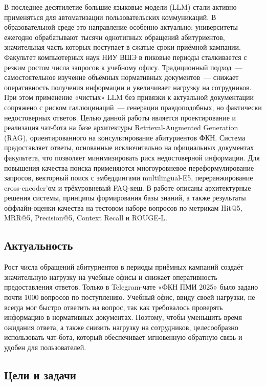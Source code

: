 \documentclass{article}
\begin{document}
В последнее десятилетие большие языковые модели (LLM) стали активно применяться
для автоматизации пользовательских коммуникаций. В образовательной среде это
направление особенно актуально: университеты ежегодно обрабатывают тысячи
однотипных обращений абитуриентов, значительная часть которых поступает в сжатые
сроки приёмной кампании.
Факультет компьютерных наук НИУ ВШЭ в пиковые периоды сталкивается с резким
ростом числа запросов к учебному офису. Традиционный подход~--- самостоятельное
изучение объёмных нормативных документов~--- снижает оперативность получения
информации и увеличивает нагрузку на сотрудников. При этом применение «чистых»
LLM без привязки к актуальной документации сопряжено с риском галлюцинаций~---
генерации правдоподобных, но фактически недостоверных ответов.
Целью данной работы является проектирование и реализация чат-бота на базе
архитектуры Retrieval-Augmented Generation (RAG), ориентированного на консультирование
абитуриентов ФКН. Система предоставляет ответы, основанные исключительно на
официальных документах факультета, что позволяет минимизировать риск недостоверной
информации. Для повышения качества поиска применяются многоуровневое
переформулирование запросов, векторный поиск с эмбеддингами multilingual-E5,
переранжирование cross-encoder'ом и трёхуровневый FAQ-кеш.
В работе описаны архитектурные решения системы, принципы формирования базы
знаний, а также результаты оффлайн-оценки качества на тестовом
наборе вопросов по метрикам Hit@5, MRR@5, Precision@5, Context Recall и ROUGE-L.


\noindent 
\subsection{Актуальность}
\noindent
Рост числа обращений абитуриентов в периоды приёмных кампаний создаёт значительную нагрузку на учебные офисы и снижает оперативность предоставления ответов. Только в Telegram-чате «ФКН ПМИ 2025» было задано почти 1000 вопросов по поступлению. Учебный офис, ввиду своей нагрузки, не всегда мог быстро ответить на вопрос, так как требовалось проверять информацию в нормативных документах. Поэтому, чтобы уменьшить время ожидания ответа, а также снизить нагрузку на сотрудников, целесообразно использовать чат-бота, который обеспечивает мгновенную обратную связь и удобен для пользователей. 


\subsection{Цели и задачи}
\end{document}
